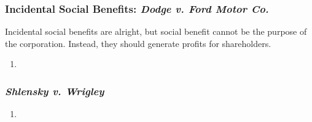 \subsubsection{Incidental Social Benefits: \emph{Dodge v. Ford Motor Co.}}

Incidental social benefits are alright, but social benefit cannot be the 
purpose of the corporation. Instead, they should generate profits for 
shareholders.

\begin{enumerate}
    \item %
\end{enumerate}

\subsubsection{\emph{Shlensky v. Wrigley}}

\begin{enumerate}
    \item %
\end{enumerate}

